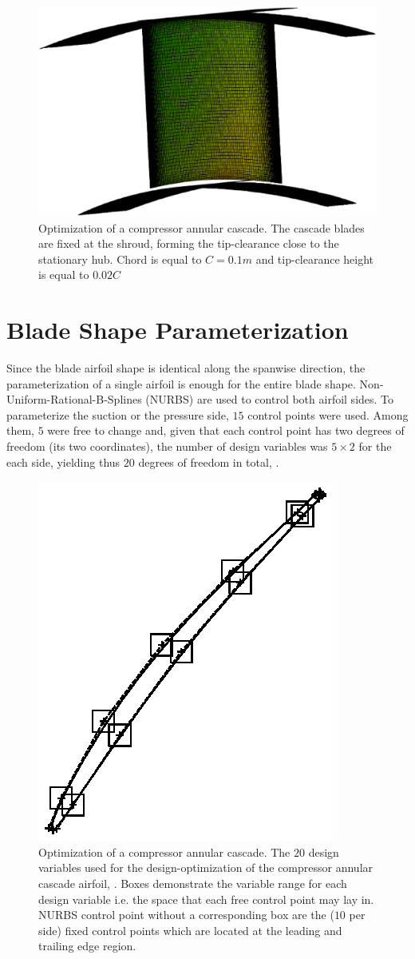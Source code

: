 \begin{figure}[h!]
\centering
  \includegraphics[width=.7\textwidth]{blade.eps}
  \caption{Optimization of a compressor annular cascade. The cascade blades are fixed at the shroud, forming the tip-clearance close to the stationary hub. Chord is equal to $C=0.1m$ and tip-clearance height is equal to $0.02C$}
  \label{res:ntua_blade:blade}
\end{figure}

\section{Blade Shape Parameterization}
Since the blade airfoil shape is identical along the spanwise direction, the parameterization of a single airfoil is enough for the entire blade shape. Non-Uniform-Rational-B-Splines (NURBS) are used to control both airfoil sides. To parameterize the suction or the pressure side, $15$ control points were used. Among them, $5$ were free to change and, given that each control point has two degrees of freedom (its two coordinates), the number of design variables was $5 \! \times \! 2$ for the each side, yielding thus $20$ degrees of freedom in total, \cite{phd_Kampolis}. 

\begin{figure}[h!]
\centering
  \includegraphics[width=.5\textwidth]{foil_cp2.eps}
  \caption{Optimization of a compressor annular cascade. The $20$ design variables used for the design-optimization of the compressor annular cascade airfoil, \cite{phd_Kampolis}. Boxes demonstrate the variable range for each design variable i.e. the space that each free control point may lay in. NURBS control point without a corresponding box are the ($10$ per side) fixed control points which are located at the leading and trailing edge region.}
  \label{res:ntua_blade:cp}
\end{figure}



